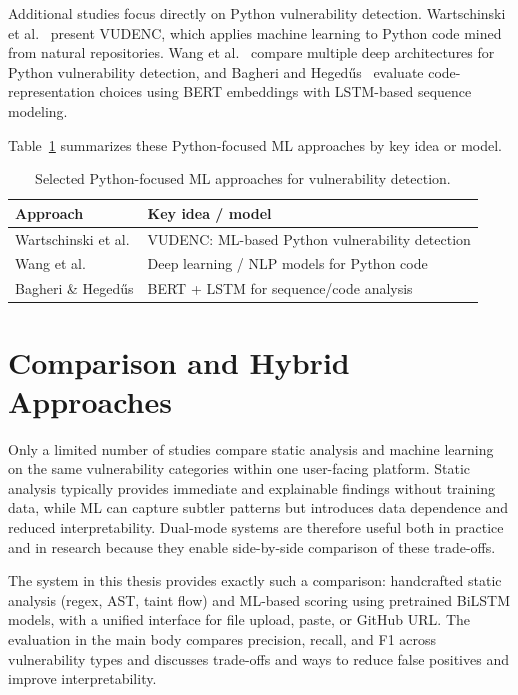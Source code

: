 Additional studies focus directly on Python vulnerability detection. Wartschinski et al.~\cite{VulnDetection} present VUDENC, which applies machine learning to Python code mined from natural repositories. Wang et al.~\cite{Wang2024DLPythonVuln} compare multiple deep architectures for Python vulnerability detection, and Bagheri and Hegedűs~\cite{Bagheri2021PythonVuln} evaluate code-representation choices using BERT embeddings with LSTM-based sequence modeling.

Table~\ref{tab:rw_python_ml} summarizes these Python-focused ML approaches by key idea or model.

\begin{table}[htbp]
\centering
\caption{Selected Python-focused ML approaches for vulnerability detection.}
\label{tab:rw_python_ml}
\begin{tabular}{@{}ll@{}}
\hline
\textbf{Approach} & \textbf{Key idea / model} \\
\hline
Wartschinski et al. & VUDENC: ML-based Python vulnerability detection \\
Wang et al. & Deep learning / NLP models for Python code \\
Bagheri \& Hegedűs & BERT + LSTM for sequence/code analysis \\
\hline
\end{tabular}
\end{table}

\section{Comparison and Hybrid Approaches}
\label{sec:rw_comparison}

Only a limited number of studies compare static analysis and machine learning on the same vulnerability categories within one user-facing platform. Static analysis typically provides immediate and explainable findings without training data, while ML can capture subtler patterns but introduces data dependence and reduced interpretability. Dual-mode systems are therefore useful both in practice and in research because they enable side-by-side comparison of these trade-offs.

The system in this thesis provides exactly such a comparison: handcrafted static analysis (regex, AST, taint flow) and ML-based scoring using pretrained BiLSTM models, with a unified interface for file upload, paste, or GitHub URL. The evaluation in the main body compares precision, recall, and F1 across vulnerability types and discusses trade-offs and ways to reduce false positives and improve interpretability.
